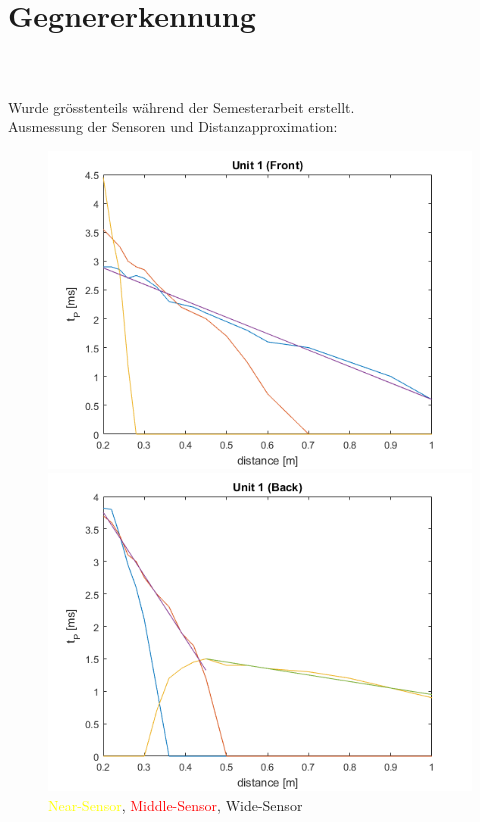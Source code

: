 \section{Gegnererkennung}
\begin{frame}
\frametitle{\,}
Wurde grösstenteils während der Semesterarbeit erstellt.\\
Ausmessung der Sensoren und Distanzapproximation:
\begin{figure}
	\includegraphics[height = 4 cm]{../images/presentation/OD/FRONT_1.png}
	\hspace{2em}
	\includegraphics[height = 4 cm]{../images/presentation/OD/BACK_1.png}\\
	\textcolor{yellow}{Near-Sensor}, \textcolor{red}{Middle-Sensor}, \textcolor{cBlue}{Wide-Sensor}
\end{figure}

\end{frame}